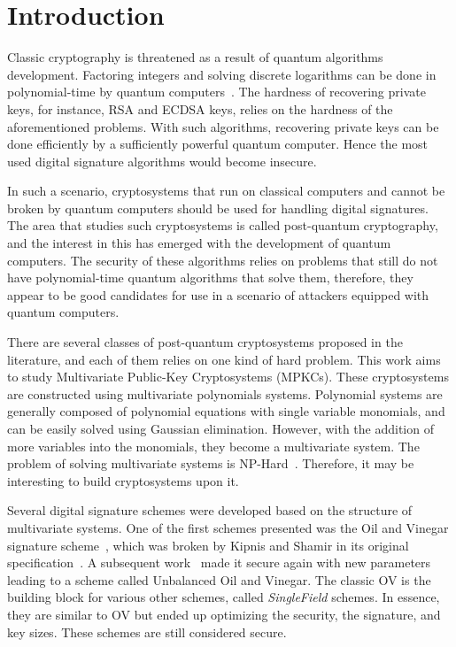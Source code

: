 \documentclass{ufsctex/ufsctex}
\makeatletter
\renewcommand{\listadeabreviaturas}{
	\pretextualchapter{List of Acronyms}\@starttoc{las}}
\renewcommand{\listadesimbolos}{
	\pretextualchapter{List of Symbols}\@starttoc{lsb}}
\renewcommand{\listadealgoritmos}{
	\pretextualchapter{List of Algorithms}\@starttoc{loa}}
\makeatother
\begin{document}
\capa{}
\pretextuais{}
\listadefiguras{}
\listadeabreviaturas{}
\sumario{}

\chapter{Introduction}

Classic cryptography is threatened as a result of quantum algorithms
development. Factoring integers and solving discrete logarithms can be done in
polynomial-time by quantum computers~\cite{shor1999polynomial}. The hardness of
recovering private keys, for instance, RSA
and ECDSA keys, relies
on the hardness of the aforementioned problems. With such algorithms,
recovering private keys can be done efficiently by a sufficiently powerful
quantum computer. Hence the most used digital signature algorithms would become
insecure.

In such a scenario, cryptosystems that run on classical computers and cannot be
broken by quantum computers should be used for handling digital signatures. The
area that studies such cryptosystems is called post-quantum cryptography, and
the interest in this has emerged with the development of quantum computers. The
security of these algorithms relies on problems that still do not have
polynomial-time quantum algorithms that solve them, therefore, they appear to
be good candidates for use in a scenario of attackers equipped with quantum
computers.

There are several classes of post-quantum cryptosystems proposed in the
literature, and each of them relies on one kind of hard problem. This work aims
to study Multivariate Public-Key Cryptosystems
(MPKCs). These
cryptosystems are constructed using multivariate polynomials systems.
Polynomial systems are generally composed of polynomial equations with single
variable monomials, and can be easily solved using Gaussian elimination.
However, with the addition of more variables into the monomials, they become a
multivariate system. The problem of solving multivariate systems is
NP-Hard~\cite{garey1990npc}. Therefore, it may be interesting to build
cryptosystems upon it.

Several digital signature schemes were developed based on the structure of
multivariate systems. One of the first schemes presented was the Oil and
Vinegar signature scheme~\cite{patarin1997ov}, which
was broken by Kipnis and Shamir in its original
specification~\cite{kipnis1998cryptanalysis}. A subsequent
work~\cite{kipnis1999unbalanced} made it secure again with new parameters
leading to a scheme called Unbalanced Oil and Vinegar. The classic OV is the building block for various other
schemes, called \textit{SingleField} schemes. In essence, they are similar to
OV but ended up optimizing the security, the signature, and key sizes. These
schemes are still considered secure.
\end{document}
